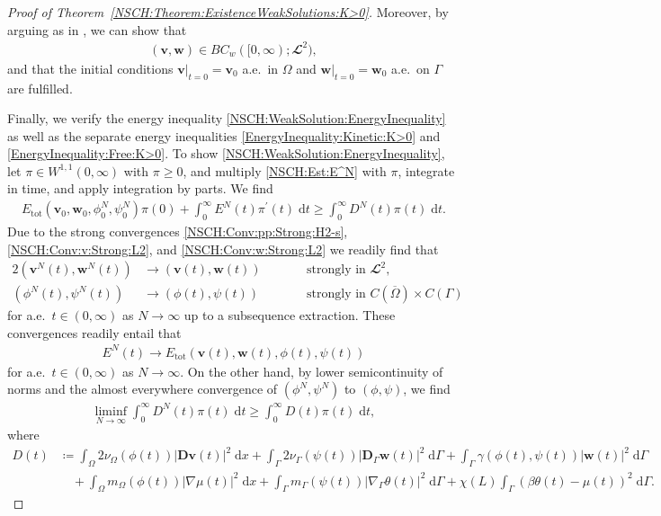 \documentclass[11pt,reqno]{amsart}
\theoremstyle{remark}
\numberwithin{equation}{section}
\newcommand{\abs}[1]{|#1|}
\newcommand{\intO}{\int_\Omega}
\newcommand{\intG}{\int_\Gamma}
\newcommand{\dx}{\;\mathrm{d}x}
\newcommand{\dt}{\;\mathrm dt}
\newcommand{\dG}{\;\mathrm d\Ga}
\newcommand{\Grad}{\nabla}
\newcommand{\Gradg}{\nabla_\Ga}
\newcommand{\Om}{\Omega}
\newcommand{\Ga}{\Gamma}
\newcommand{\bv}{\mathbf v}
\newcommand{\bw}{\mathbf w}
\newcommand{\D}{\mathbf D}
\newcommand{\Dg}{\mathbf D_\Ga}
\begin{document}
\begin{proof}[Proof of Theorem~\ref{NSCH:Theorem:ExistenceWeakSolutions:K>0}]
Moreover, by arguing as in \cite[Section~6.4]{Knopf2025a}, we can show that
\begin{align*}
    (\bv,\bw)\in BC_w([0,\infty);\mathbfcal{L}^2),
\end{align*}
and that the initial conditions $\bv\vert_{t=0} = \bv_0$ a.e.~in $\Om$ and $\bw\vert_{t=0} = \bw_0$ a.e.~on $\Ga$ are fulfilled.

Finally, we verify the energy inequality \eqref{NSCH:WeakSolution:EnergyInequality} as well as the separate energy inequalities \eqref{EnergyInequality:Kinetic:K>0} and \eqref{EnergyInequality:Free:K>0}. To show \eqref{NSCH:WeakSolution:EnergyInequality}, let $\pi\in W^{1,1}(0,\infty)$ with $\pi\geq 0$, and multiply \eqref{NSCH:Est:E^N} with $\pi$, integrate in time, and apply integration by parts. We find
\begin{align}\label{NSCH:Est:E^N:2}
	E_{\mathrm{tot}}(\bv_0,\bw_0,\phi_0^N,\psi_0^N)\pi(0) + \int_0^\infty E^N(t)\pi^\prime(t)\dt \geq \int_0^\infty D^N(t)\pi(t)\dt.
\end{align}
Due to the strong convergences \eqref{NSCH:Conv:pp:Strong:H2-s},\eqref{NSCH:Conv:v:Strong:L2}, and \eqref{NSCH:Conv:w:Strong:L2} we readily find that
\begin{alignat*}{2}
	(\bv^N(t),\bw^N(t)) &\rightarrow (\bv(t),\bw(t)) &&\qquad\text{strongly in~}\mathbfcal{L}^2, \\
	(\phi^N(t),\psi^N(t)) &\rightarrow (\phi(t),\psi(t)) &&\qquad\text{strongly in~}C(\overline\Om)\times C(\Ga)
\end{alignat*}
for a.e.~$t\in(0,\infty)$ as $N\rightarrow\infty$ up to a subsequence extraction. These convergences readily entail that
\begin{align*}
	E^N(t) \rightarrow E_{\mathrm{tot}}(\bv(t),\bw(t),\phi(t),\psi(t))
\end{align*}
for a.e.~$t\in(0,\infty)$ as $N\rightarrow\infty$. On the other hand, by lower semicontinuity of norms and the almost everywhere convergence of $(\phi^N,\psi^N)$ to $(\phi,\psi)$, we find
\begin{align*}
	\liminf_{N\rightarrow\infty} \int_0^\infty D^N(t)\pi(t)\dt \geq \int_0^\infty D(t)\pi(t)\dt,
\end{align*}
where
\begin{align*}
	D(t) &\coloneqq \intO 2\nu_\Om(\phi(t))\abs{\D\bv(t)}^2\dx + \intG 2\nu_\Ga(\psi(t))\abs{\Dg\bw(t)}^2\dG + \intG \gamma(\phi(t),\psi(t))\abs{\bw(t)}^2\dG \\
	&\quad + \intO m_\Om(\phi(t))\abs{\Grad\mu(t)}^2\dx + \intG m_\Ga(\psi(t))\abs{\Gradg\theta(t)}^2\dG + \chi(L)\intG (\beta\theta(t) - \mu(t))^2\dG.

\end{align*}
\end{proof}
\end{document}
